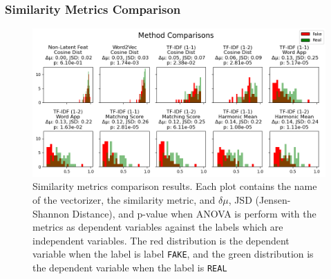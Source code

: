 \documentclass{article}
\begin{document}
\subsubsection{Similarity Metrics Comparison} \label{section:similarity-results}
\begin{figure}[h]
  \centering
  \includegraphics[width=\textwidth]{img/textual_relevance_3.png}
  \caption{Similarity metrics comparison results. Each plot contains the name of the vectorizer, the similarity metric, and $\delta \mu$, JSD (Jensen-Shannon Distance), and p-value when ANOVA is perform with the metrics as dependent variables against the labels which are independent variables. The red distribution is the dependent variable when the label is label \texttt{FAKE}, and the green distribution is the dependent variable when the label is \texttt{REAL}}
  \label{similarity-metrics}
\end{figure}
\end{document}

